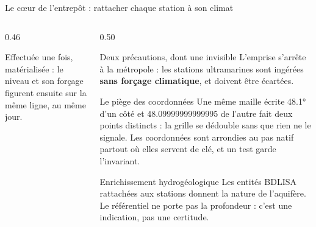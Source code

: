 \documentclass[aspectratio=169,11pt]{beamer}
\begin{document}
\begin{frame}{Le cœur de l'entrepôt : rattacher chaque station à son climat}
\vspace{-2pt}

\begin{columns}[T]
\begin{column}{0.46\textwidth}
\vspace{0.5cm}
\begin{center}
\end{center}

\vspace{0.35cm}
{\footnotesize\color{grisardoise} Effectuée une fois, matérialisée : le niveau et son forçage
figurent ensuite sur la même ligne, au même jour.\par}
\end{column}

\begin{column}{0.50\textwidth}
\small
\begin{apport}{Deux précautions, dont une invisible}
L'emprise s'arrête à la métropole : les stations ultramarines sont ingérées \textbf{sans forçage
climatique}, et doivent être écartées.
\end{apport}

\begin{apport}{Le piège des coordonnées}
Une même maille écrite \ang{48.1} d'un côté et \num{48.09999999999995} de l'autre fait deux
points distincts : la grille se dédouble sans que rien ne le signale. Les coordonnées sont
arrondies au pas natif partout où elles servent de clé, et un test garde l'invariant.
\end{apport}

\begin{apport}{Enrichissement hydrogéologique}
Les entités BDLISA rattachées aux stations donnent la nature de l'aquifère. Le référentiel ne
porte pas la profondeur : c'est une indication, pas une certitude.
\end{apport}
\end{column}
\end{columns}
\end{frame}
\end{document}
